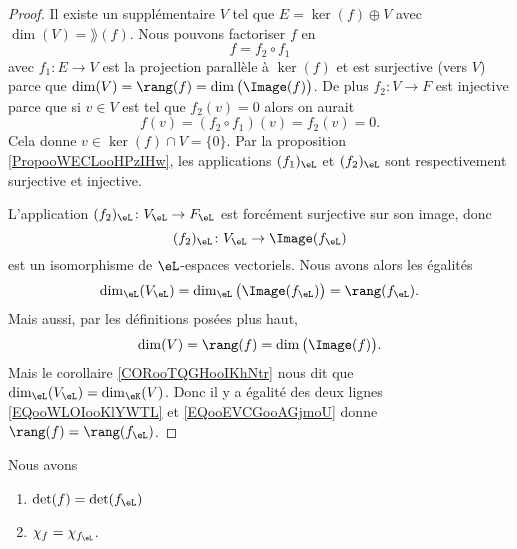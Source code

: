 \begin{proof}
    Il existe un supplémentaire \( V\) tel que \( E=\ker(f)\oplus V\) avec \( \dim(V)=\rang(f)\). Nous pouvons factoriser \( f\) en 
    \begin{equation}
        f=f_2\circ f_1
    \end{equation}
    avec \( f_1\colon E\to V\) est la projection parallèle à \( \ker(f)\) et est surjective (vers \( V\)) parce que \( \dim(V)=\rang(f)=\dim\big( \Image(f) \big)\). De plus \( f_2\colon V\to F\) est injective parce que si \( v\in V\) est tel que \( f_2(v)=0\) alors on aurait
    \begin{equation}
        f(v)=(f_2\circ f_1)(v)=f_2(v)=0.
    \end{equation}
    Cela donne \( v\in\ker(f)\cap V=\{ 0 \}\). Par la proposition \ref{PropooWECLooHPzIHw}, les applications \( (f_1)_{\eL}\) et \( (f_2)_{\eL}\) sont respectivement surjective et injective.

    L'application \( (f_2)_{\eL}\colon V_{\eL}\to F_{\eL}\) est forcément surjective sur son image, donc
    \begin{equation}
        (f_2)_{\eL}\colon V_{\eL}\to \Image(f_{\eL}) 
    \end{equation}
    est un isomorphisme de \( \eL\)-espaces vectoriels. Nous avons alors les égalités
    \begin{equation}        \label{EQooWLOIooKlYWTL}
        \dim_{\eL}(V_{\eL})=\dim_{\eL}\big( \Image(f_{\eL}) \big)=\rang(f_{\eL}).
    \end{equation}
    Mais aussi, par les définitions posées plus haut,
    \begin{equation}        \label{EQooEVCGooAGjmoU}
        \dim(V)=\rang(f)=\dim\big( \Image(f) \big).
    \end{equation}
    Mais le corollaire \ref{CORooTQGHooIKhNtr} nous dit que \( \dim_{\eL}(V_{\eL})=\dim_{\eK}(V)\). Donc il y a égalité des deux lignes \eqref{EQooWLOIooKlYWTL} et \eqref{EQooEVCGooAGjmoU} donne \( \rang(f)=\rang(f_{\eL})\).
\end{proof}

\begin{proposition}     \label{PROPooZAZFooUFdCUv}
    Nous avons
    \begin{enumerate}
        \item
            \( \det(f)=\det(f_{\eL})\)
        \item
            \( \chi_f=\chi_{f_{\eL}}\).
    \end{enumerate}
\end{proposition}

